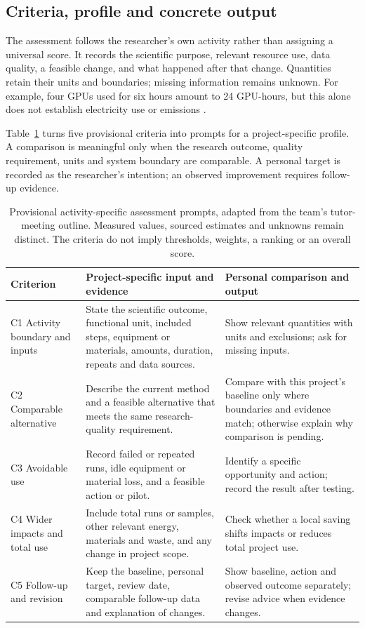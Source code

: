 \subsection{Criteria, profile and concrete output}
The assessment follows the researcher's own activity rather than assigning a universal score. It records the scientific purpose, relevant resource use, data quality, a feasible change, and what happened after that change. Quantities retain their units and boundaries; missing information remains unknown. For example, four GPUs used for six hours amount to 24 GPU-hours, but this alone does not establish electricity use or emissions \citep{lacoste2019carbon}.

Table~\ref{tab:phase2-profile} turns five provisional criteria into prompts for a project-specific profile. A comparison is meaningful only when the research outcome, quality requirement, units and system boundary are comparable. A personal target is recorded as the researcher's intention; an observed improvement requires follow-up evidence.
\begin{table}[H]
\centering\small
\begin{tabularx}{\textwidth}{@{}>{\raggedright\arraybackslash}p{}>{\raggedright\arraybackslash}p{}>{\raggedright\arraybackslash}X@{}}
\toprule
Criterion & Project-specific input and evidence & Personal comparison and output \\
\midrule
C1 Activity boundary and inputs & State the scientific outcome, functional unit, included steps, equipment or materials, amounts, duration, repeats and data sources. & Show relevant quantities with units and exclusions; ask for missing inputs. \\
C2 Comparable alternative & Describe the current method and a feasible alternative that meets the same research-quality requirement. & Compare with this project's baseline only where boundaries and evidence match; otherwise explain why comparison is pending. \\
C3 Avoidable use & Record failed or repeated runs, idle equipment or material loss, and a feasible action or pilot. & Identify a specific opportunity and action; record the result after testing. \\
C4 Wider impacts and total use & Include total runs or samples, other relevant energy, materials and waste, and any change in project scope. & Check whether a local saving shifts impacts or reduces total project use. \\
C5 Follow-up and revision & Keep the baseline, personal target, review date, comparable follow-up data and explanation of changes. & Show baseline, action and observed outcome separately; revise advice when evidence changes. \\
\bottomrule
\end{tabularx}
\caption{Provisional activity-specific assessment prompts, adapted from the team's tutor-meeting outline. Measured values, sourced estimates and unknowns remain distinct. The criteria do not imply thresholds, weights, a ranking or an overall score.}
\label{tab:phase2-profile}
\end{table}
